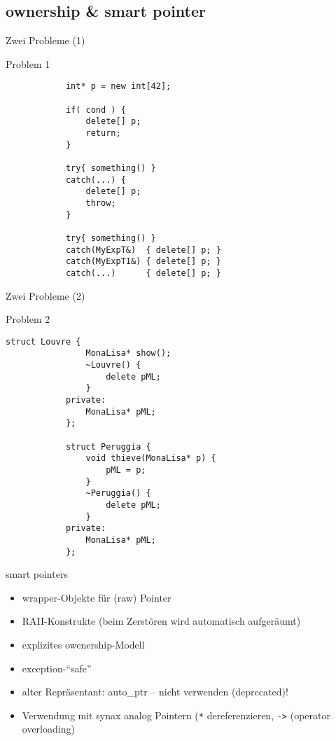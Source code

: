 \subsection{ownership \& smart pointer}

\begin{frame}[fragile]{Zwei Probleme (1)}
	\begin{block}{Problem 1}
		\begin{lstlisting}
			int* p = new int[42];
			
			if( cond ) {
			    delete[] p;
			    return;
			}
			
			try{ something() }
			catch(...) {
			    delete[] p;
			    throw;
			}
			
			try{ something() }
			catch(MyExpT&)  { delete[] p; }
			catch(MyExpT1&) { delete[] p; }
			catch(...)      { delete[] p; }
		\end{lstlisting}
	\end{block}
\end{frame}

\begin{frame}[fragile]{Zwei Probleme (2)}
	\begin{block}{Problem 2}
		\begin{lstlisting}[basicstyle=\scriptsize]
			struct Louvre {
			    MonaLisa* show();
			    ~Louvre() {
			        delete pML;
			    }
			private:
			    MonaLisa* pML;
			};
			
			struct Peruggia {
			    void thieve(MonaLisa* p) {
			        pML = p;
			    }
			    ~Peruggia() {
			        delete pML;
			    }
			private:
			    MonaLisa* pML;
			};
		\end{lstlisting}
	\end{block}
\end{frame}

\begin{frame}{ smart pointers }
	\begin{itemize}
		\item wrapper-Objekte für (raw) Pointer
		\item RAII-Konstrukte (beim Zerstören wird automatisch aufgeräumt)
		\item explizites owenership-Modell
		\item exception-\enquote{safe}
		\item alter Repräsentant: auto\_ptr -- nicht verwenden (deprecated)!
		\item Verwendung mit synax analog Pointern (\texttt{*} dereferenzieren, \texttt{->} (operator overloading)
	\end{itemize}
\end{frame}

